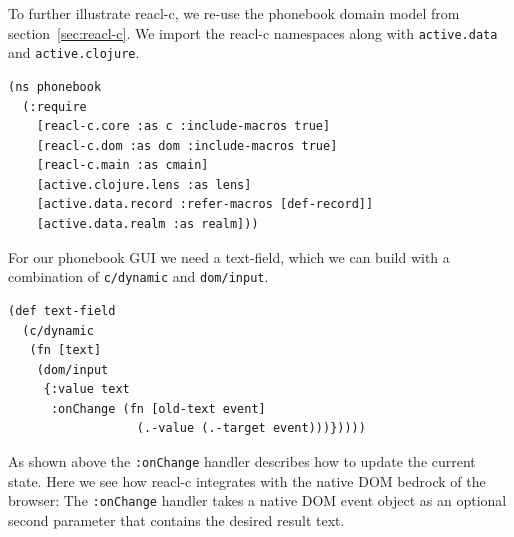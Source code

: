 \documentclass[sigplan,screen]{acmart}
\begin{document}
To further illustrate reacl-c, we re-use the phonebook domain model 
from section~\ref{sec:reacl-c}.  We import the reacl-c namespaces along with
\texttt{active.data} and \texttt{active.clojure}.
%
\begin{verbatim}
(ns phonebook
  (:require
    [reacl-c.core :as c :include-macros true]
    [reacl-c.dom :as dom :include-macros true]
    [reacl-c.main :as cmain]
    [active.clojure.lens :as lens]
    [active.data.record :refer-macros [def-record]]
    [active.data.realm :as realm]))
\end{verbatim}
%
For our phonebook GUI we need a text-field, which we can build
with a combination of \texttt{c/dynamic} and \texttt{dom/input}.
%
\begin{verbatim}
(def text-field
  (c/dynamic
   (fn [text]
    (dom/input
     {:value text
      :onChange (fn [old-text event]
                  (.-value (.-target event)))}))))
\end{verbatim}
%
As shown above the \texttt{:onChange} handler describes how to update
the current state.  Here we see how reacl-c integrates with the native
DOM bedrock of the browser: The \texttt{:onChange} handler takes a
native DOM event object as an optional second
parameter that contains the desired result text.
\end{document}
